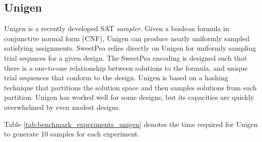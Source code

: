 \subsection{Unigen}

%

Unigen \cite{chakraborty2013scalable} is a recently developed SAT \textit{sampler}. Given a boolean formula in conjunctive normal form (CNF), Unigen can produce nearly uniformly sampled satisfying assignments. SweetPea relies directly on Unigen for uniformly sampling trial sequnces for a given design. The SweetPea encoding is designed such that there is a one-to-one relationship between solutions to the formula, and unique trial sequences that conform to the design. Unigen is based on a hashing technique that partitions the solution space and then samples solutions from each partition. Unigen has worked well for some designs, but its capacities are quickly overwhelmed by even modest designs.

Table \ref{tab:benchmark_experiments_unigen} denotes the time required for Unigen to generate 10 samples for each experiment.



